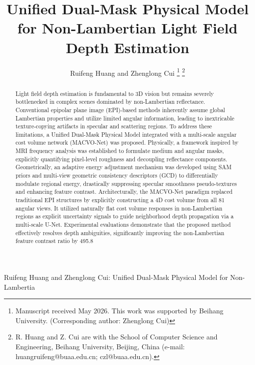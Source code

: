 \documentclass[lettersize,journal]{IEEEtran}
\begin{document}
\title{Unified Dual-Mask Physical Model for Non-Lambertian Light Field Depth Estimation}

\author{Ruifeng Huang and Zhenglong Cui
\thanks{Manuscript received May 2026. This work was supported by Beihang University. (Corresponding author: Zhenglong Cui)}
\thanks{R. Huang and Z. Cui are with the School of Computer Science and Engineering, Beihang University, Beijing, China (e-mail: huangruifeng@buaa.edu.cn; czl@buaa.edu.cn).}}

%
{Ruifeng Huang and Zhenglong Cui: Unified Dual-Mask Physical Model for Non-Lambertia}

\maketitle

\begin{abstract}
Light field depth estimation is fundamental to 3D vision but remains severely bottlenecked in complex scenes dominated by non-Lambertian reflectance. Conventional epipolar plane image (EPI)-based methods inherently assume global Lambertian properties and utilize limited angular information, leading to inextricable texture-copying artifacts in specular and scattering regions. To address these limitations, a Unified Dual-Mask Physical Model integrated with a multi-scale angular cost volume network (MACVO-Net) was proposed. Physically, a framework inspired by MRI frequency analysis was established to formulate medium and angular masks, explicitly quantifying pixel-level roughness and decoupling reflectance components. Geometrically, an adaptive energy adjustment mechanism was developed using SAM priors and multi-view geometric consistency descriptors (GCD) to differentially modulate regional energy, drastically suppressing specular smoothness pseudo-textures and enhancing feature contrast. Architecturally, the MACVO-Net paradigm replaced traditional EPI structures by explicitly constructing a 4D cost volume from all 81 angular views. It utilized naturally flat cost volume responses in non-Lambertian regions as explicit uncertainty signals to guide neighborhood depth propagation via a multi-scale U-Net. Experimental evaluations demonstrate that the proposed method effectively resolves depth ambiguities, significantly improving the non-Lambertian feature contrast ratio by 495.8%
\end{abstract}
\end{document}
